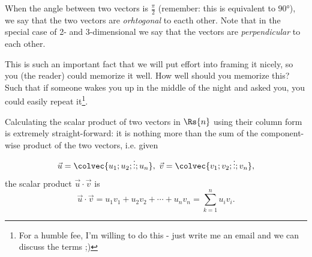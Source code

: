 When the angle between two vectors is $\frac{\pi}{2}$ (remember: this is equivalent to $\ang{90}$), we say that the two vectors are \emph{orhtogonal} to eacth other. Note that in the special case of 2- and 3-dimensional we say that the vectors are \emph{perpendicular} to each other.

This is such an important fact that we will put effort into framing it nicely, so you (the reader) could memorize it well. How well should you memorize this? Such that if someone wakes you up in the middle of the night and asked you, you could easily repeat it\footnote{For a humble fee, I'm willing to do this - just write me an email and we can discuss the terms ;)}.

\begin{figure}
	\centering
\end{figure}

Calculating the scalar product of two vectors in $\Rs{n}$ using their column form is extremely straight-forward: it is nothing more than the sum of the component-wise product of the two vectors, i.e. given
\[
	\vec{u}=\colvec{u_{1};u_{2};\vdots;u_{n}},\ \vec{v}=\colvec{v_{1};v_{2};\vdots;v_{n}},
\]
the scalar product $\vec{u}\cdot\vec{v}$ is
\begin{equation}
	\vec{u}\cdot\vec{v} = u_{1}v_{1} + u_{2}v_{2} + \cdots + u_{n}v_{n} = \sum\limits_{k=1}^{n}u_{i}v_{i}.
	\label{eq:scalar product in column form}
\end{equation}

